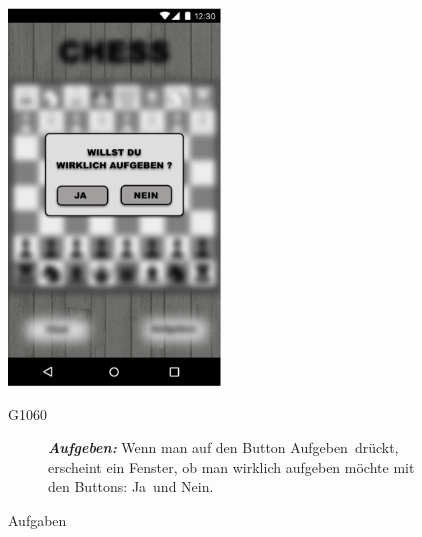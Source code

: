 \documentclass[parskip=full]{scrartcl}
\begin{document}
\begin{figure}[htp]
		\begin{minipage}[t]{6cm}
			\vspace{0pt}
			\includegraphics[height=100mm]{aufgeben.png}
			\caption{Aufgaben}
			\label{fig:Aufgeben}
		\end{minipage}
		\hfill
		\begin{minipage}[t]{6cm}
			\vspace{0pt}
			\begin{description}
				\item[G1060] \textbf{\textit{Aufgeben: }} Wenn man auf den Button \glqq Aufgeben\grqq\  drückt, erscheint ein Fenster, ob man wirklich aufgeben möchte mit den Buttons: \glqq Ja\grqq\ und \glqq Nein\grqq.
			\end{description}
		\end{minipage}
	\end{figure}
	
\end{document}
